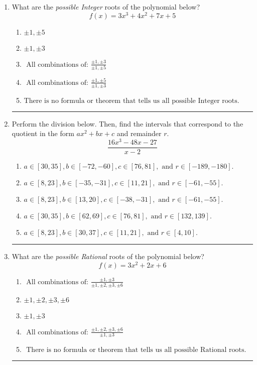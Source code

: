 \documentclass[14pt]{extbook}
\newcommand{\litem}[1]{\item#1\hspace*{-1cm}\rule{\textwidth}{0.4pt}}
\begin{document}
\begin{enumerate}
\litem{
What are the \textit{possible Integer} roots of the polynomial below?\[ f(x) = 3x^{3} +4 x^{2} +7 x + 5 \]\begin{enumerate}[label=\Alph*.]
\item \( \pm 1,\pm 5 \)
\item \( \pm 1,\pm 3 \)
\item \( \text{ All combinations of: }\frac{\pm 1,\pm 3}{\pm 1,\pm 5} \)
\item \( \text{ All combinations of: }\frac{\pm 1,\pm 5}{\pm 1,\pm 3} \)
\item \( \text{There is no formula or theorem that tells us all possible Integer roots.} \)

\end{enumerate} }
\litem{
Perform the division below. Then, find the intervals that correspond to the quotient in the form $ax^2+bx+c$ and remainder $r$.\[ \frac{16x^{3} -48 x -27}{x -2} \]\begin{enumerate}[label=\Alph*.]
\item \( a \in [30, 35], b \in [-72, -60], c \in [76, 81], \text{ and } r \in [-189, -180]. \)
\item \( a \in [8, 23], b \in [-35, -31], c \in [11, 21], \text{ and } r \in [-61, -55]. \)
\item \( a \in [8, 23], b \in [13, 20], c \in [-38, -31], \text{ and } r \in [-61, -55]. \)
\item \( a \in [30, 35], b \in [62, 69], c \in [76, 81], \text{ and } r \in [132, 139]. \)
\item \( a \in [8, 23], b \in [30, 37], c \in [11, 21], \text{ and } r \in [4, 10]. \)

\end{enumerate} }
\litem{
What are the \textit{possible Rational} roots of the polynomial below?\[ f(x) = 3x^{2} +2 x + 6 \]\begin{enumerate}[label=\Alph*.]
\item \( \text{ All combinations of: }\frac{\pm 1,\pm 3}{\pm 1,\pm 2,\pm 3,\pm 6} \)
\item \( \pm 1,\pm 2,\pm 3,\pm 6 \)
\item \( \pm 1,\pm 3 \)
\item \( \text{ All combinations of: }\frac{\pm 1,\pm 2,\pm 3,\pm 6}{\pm 1,\pm 3} \)
\item \( \text{ There is no formula or theorem that tells us all possible Rational roots.} \)


\end{enumerate}}
\end{enumerate}
\end{document}
